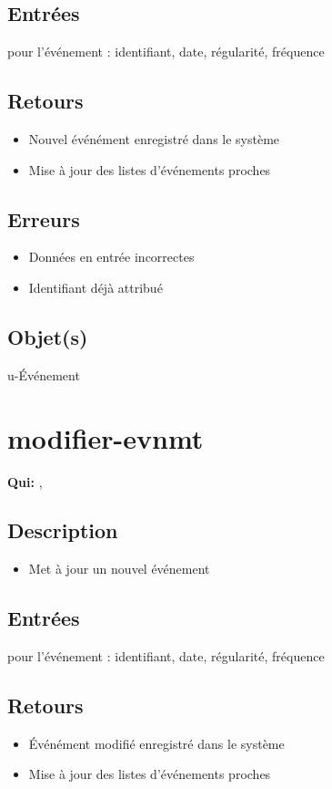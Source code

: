 	\subsection{Entrées}
		pour l'événement : identifiant, date, régularité, fréquence

	\subsection{Retours}
	\begin{itemize}
		\item Nouvel événément enregistré dans le système
		\item Mise à jour des listes d'événements proches
	\end{itemize}

	\subsection{Erreurs}
	\begin{itemize}
		\item Données en entrée incorrectes \fatal
		\item Identifiant déjà attribué \fatal
	\end{itemize}

	\subsection{Objet(s)}
		u-Événement

\section{modifier-evnmt}
	\textbf{Qui:} \urt, \us

	\subsection{Description}
	\begin{itemize}
		\item Met à jour un nouvel événement
	\end{itemize}

	\subsection{Entrées}
		pour l'événement : identifiant, date, régularité, fréquence

	\subsection{Retours}
	\begin{itemize}
		\item Événément modifié enregistré dans le système
		\item Mise à jour des listes d'événements proches
	\end{itemize}

